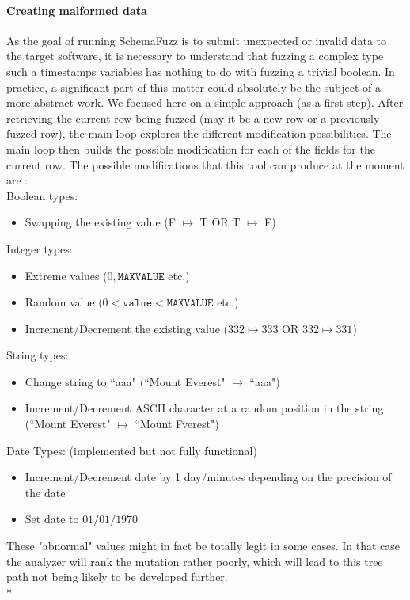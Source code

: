 \documentclass{article}
\begin{document}
\begin{empfile}
				\paragraph{Creating malformed data} 
As the goal of running SchemaFuzz is to submit unexpected or invalid data to the target software, it is necessary to understand that fuzzing a complex type such a timestamps variables has nothing to do with fuzzing a trivial boolean. In practice, a significant part of this matter could absolutely be the subject of a more abstract work. We focused here on a simple approach (as a first step).
After retrieving the current row being fuzzed (may it be a new row or a previously fuzzed row), the main loop explores the different modification possibilities.
The main loop then builds the possible modification for each of the fields for the current row. The possible modifications that this tool can produce at the moment are : \\ %
				Boolean types:
				\begin{itemize}						
					\item Swapping the existing value (F $\mapsto$ T OR T $\mapsto$ F)
				\end{itemize}
				Integer types:
				\begin{itemize}
		
					\item Extreme values ($0, \texttt{MAXVALUE}$ etc.)
					\item Random value ($0<\texttt{value}<\texttt{MAXVALUE}$ etc.)
					\item Increment/Decrement the existing value ($332 \mapsto 333$ OR $332 \mapsto 331$)
				\end{itemize}
				String types:
				\begin{itemize}
					\item Change string to ``aaa" (``Mount Everest" $\mapsto$ ``aaa")
					\item Increment/Decrement ASCII character at a random position in the string (``Mount Everest" $\mapsto$ ``Mount Fverest")
				\end{itemize}
					Date Types: (implemented but not fully functional)			
				\begin{itemize}
					\item Increment/Decrement date by 1 day/minutes depending on the precision of the date
					\item Set date to $01/01/1970$ 
				\end{itemize}
These "abnormal" values might in fact be totally legit in some cases. In that case the analyzer will rank the mutation rather poorly, which will lead to this tree path not being likely to be developed further.
				\\*

\end{empfile}
\end{document}
